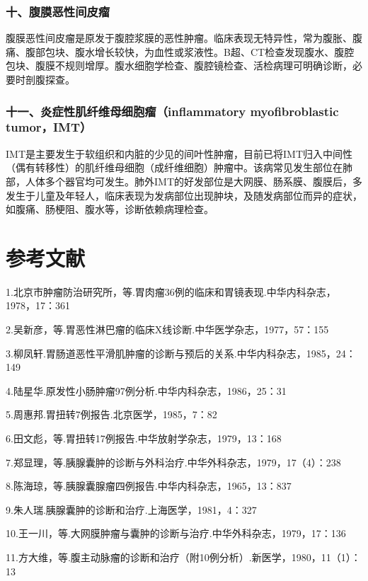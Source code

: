 \subsubsection{十、腹膜恶性间皮瘤}

腹膜恶性间皮瘤是原发于腹腔浆膜的恶性肿瘤。临床表现无特异性，常为腹胀、腹痛、腹部包块、腹水增长较快，为血性或浆液性。B超、CT检查发现腹水、腹腔包块、腹膜不规则增厚。腹水细胞学检查、腹腔镜检查、活检病理可明确诊断，必要时剖腹探查。

\subsubsection{十一、炎症性肌纤维母细胞瘤（inflammatory myofibroblastic tumor，IMT）}

IMT是主要发生于软组织和内脏的少见的间叶性肿瘤，目前已将IMT归入中间性（偶有转移性）的肌纤维母细胞（成纤维细胞）肿瘤中。该病常见发生部位在肺部，人体多个器官均可发生。肺外IMT的好发部位是大网膜、肠系膜、腹膜后，多发生于儿童及年轻人，临床表现为发病部位出现肿块，及随发病部位而异的症状，如腹痛、肠梗阻、腹水等，诊断依赖病理检查。

\protect\hypertarget{text00237.html}{}{}

\section{参考文献}

1.北京市肿瘤防治研究所，等.胃肉瘤36例的临床和胃镜表现.中华内科杂志，1978，17：361

2.吴新彦，等.胃恶性淋巴瘤的临床X线诊断.中华医学杂志，1977，57：155

3.柳凤轩.胃肠道恶性平滑肌肿瘤的诊断与预后的关系.中华内科杂志，1985，24：149

4.陆星华.原发性小肠肿瘤97例分析.中华内科杂志，1986，25：31

5.周惠邦.胃扭转7例报告.北京医学，1985，7：82

6.田文彪，等.胃扭转17例报告.中华放射学杂志，1979，13：168

7.郑显理，等.胰腺囊肿的诊断与外科治疗.中华外科杂志，1979，17（4）：238

8.陈海琼，等.胰腺囊腺瘤四例报告.中华内科杂志，1965，13：837

9.朱人瑞.胰腺囊肿的诊断和治疗.上海医学，1981，4：327

10.王一川，等.大网膜肿瘤与囊肿的诊断与治疗.中华外科杂志，1979，17：136

11.方大维，等.腹主动脉瘤的诊断和治疗（附10例分析）.新医学，1980，11（1）：13

